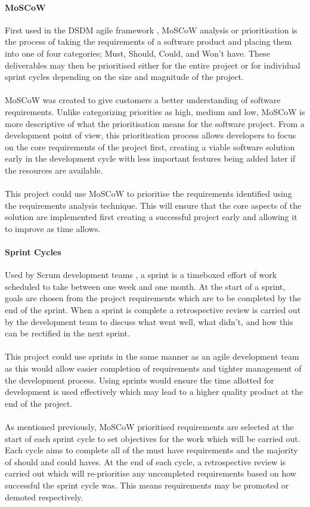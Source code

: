 		\paragraph{MoSCoW}
			First used in the DSDM agile framework \citep{bittner2002use}, MoSCoW analysis or prioritisation is the process of taking the requirements of a software product and placing them into one of four categories; Must, Should, Could, and Won’t have. These deliverables may then be prioritised either for the entire project or for individual sprint cycles depending on the size and magnitude of the project.
			\\\\
			MoSCoW was created to give customers a better understanding of software requirements. Unlike categorizing priorities as high, medium and low, MoSCoW is more descriptive of what the prioritisation means for the software project. From a development point of view, this prioritisation process allows developers to focus on the core requirements of the project first, creating a viable software solution early in the development cycle with less important features being added later if the resources are available.
			\\\\
			This project could use MoSCoW to prioritise the requirements identified using the requirements analysis technique. This will ensure that the core aspects of the solution are implemented first creating a successful project early and allowing it to improve as time allows.
		\paragraph{Sprint Cycles}
			Used by Scrum development teams \citep{rising2000scrum}, a sprint is a timeboxed effort of work scheduled to take between one week and one month. At the start of a sprint, goals are chosen from the project requirements which are to be completed by the end of the sprint. When a sprint is complete a retrospective review is carried out by the development team to discuss what went well, what didn’t, and how this can be rectified in the next sprint.
			\\\\
			This project could use sprints in the same manner as an agile development team as this would allow easier completion of requirements and tighter management of the development process. Using sprints would ensure the time allotted for development is used effectively which may lead to a higher quality product at the end of the project. 
			\\\\
			As mentioned previously, MoSCoW prioritised requirements are selected at the start of each sprint cycle to set objectives for the work which will be carried out. Each cycle aims to complete all of the must have requirements and the majority of should and could haves. At the end of each cycle, a retrospective review is carried out which will re-prioritise any uncompleted requirements based on how successful the sprint cycle was. This means requirements may be promoted or demoted respectively.

